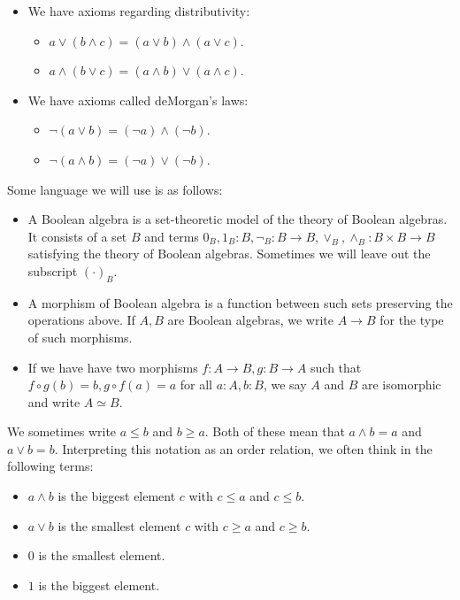 \documentclass{../util/zariski-small}
\begin{document}
\begin{definition}
\begin{itemize}
\begin{itemize}
      \end{itemize}
    \item We have axioms regarding distributivity:
      \begin{itemize}
        \item $a \vee (b \wedge c) = ( a \vee b) \wedge (a \vee c)$. 
        \item $a \wedge (b \vee c) = (a \wedge b) \vee ( a\wedge c)$. 
      \end{itemize}
    \item We have axioms called deMorgan's laws:
      \begin{itemize}
        \item $\neg (a \vee b ) = (\neg a) \wedge (\neg b)$. 
        \item $\neg (a \wedge b) = (\neg a) \vee (\neg b)$. 
      \end{itemize}
  \end{itemize}
\end{definition}
\begin{definition}
  Some language we will use is as follows:
  \begin{itemize}
    \item A Boolean algebra is a set-theoretic model of the theory of Boolean algebras. 
      It consists of a set $B$ and terms $0_B,1_B: B, \neg_B : B \to B, \vee_B, \wedge_B : B \times B \to B$ 
      satisfying the theory of Boolean algebras. 
      Sometimes we will leave out the subscript $(\cdot)_B$. 
    \item A morphism of Boolean algebra is a function between such sets preserving the operations above. 
      If $A,B$ are Boolean algebras, we write $A \to B$ for the type of such morphisms. 
    \item If we have have two morphisms $f:A\to B , g : B \to A$ such that 
      $f\circ g (b) = b, g \circ f (a) = a$ for all $a:A, b:B$, 
      we say $A$ and $B$ are isomorphic and write $A \simeq B$. 
  \end{itemize}
\end{definition}
\begin{remark}
  We sometimes write $a \leq b$ and  $b \geq a$. Both of these mean that $a\wedge b = a$ and $ a\vee b = b$. 
  Interpreting this notation as an order relation, we often think in the following terms:
  \begin{itemize}
    \item $a\wedge b$ is the biggest element $c$ with $c \leq a$ and $c\leq b$.
    \item $a\vee b$ is the smallest element $c$ with $c \geq a$ and $c \geq b$. 
    \item $0$ is the smallest element. 
    \item $1$ is the biggest element. 
  \end{itemize}
\end{remark}
\end{document}
